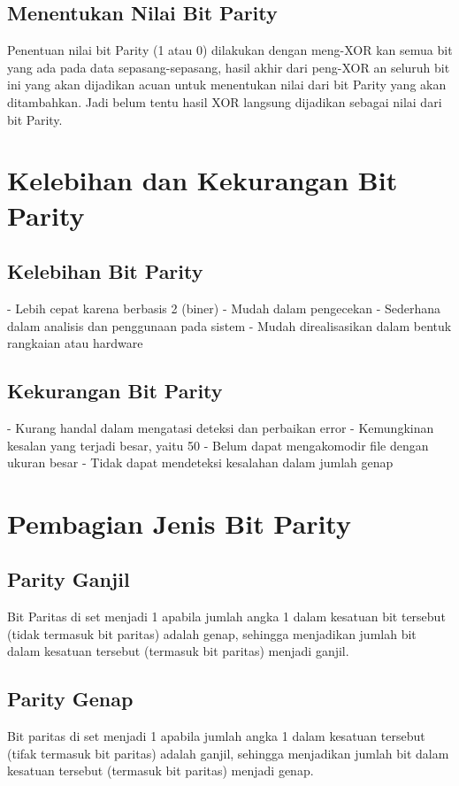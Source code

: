 \subsection{Menentukan Nilai Bit Parity}
Penentuan nilai bit Parity (1 atau 0) dilakukan dengan meng-XOR kan semua bit yang ada pada data sepasang-sepasang, hasil akhir dari peng-XOR an seluruh bit ini yang akan dijadikan acuan untuk menentukan nilai dari bit Parity yang akan ditambahkan. Jadi belum tentu hasil XOR langsung dijadikan sebagai nilai dari bit Parity.



\section{Kelebihan dan Kekurangan Bit Parity}
\subsection{Kelebihan Bit Parity}
-   Lebih cepat karena berbasis 2 (biner)
-   Mudah dalam pengecekan
-   Sederhana dalam analisis dan penggunaan pada sistem
-   Mudah direalisasikan dalam bentuk rangkaian atau hardware

\subsection{Kekurangan Bit Parity}
-   Kurang handal dalam mengatasi deteksi dan perbaikan error
-   Kemungkinan kesalan yang terjadi besar, yaitu 50%
-   Belum dapat mengakomodir file dengan ukuran besar
-   Tidak dapat mendeteksi kesalahan dalam jumlah genap



\section{Pembagian Jenis Bit Parity}
\subsection{Parity Ganjil}
Bit Paritas di set menjadi 1 apabila jumlah angka 1 dalam kesatuan bit tersebut (tidak termasuk bit paritas) adalah genap, sehingga menjadikan jumlah bit dalam kesatuan tersebut (termasuk bit paritas) menjadi ganjil.
 
\subsection{Parity Genap}
Bit paritas di set menjadi 1 apabila jumlah angka 1 dalam kesatuan tersebut (tifak termasuk bit paritas) adalah ganjil, sehingga menjadikan jumlah bit dalam kesatuan tersebut (termasuk bit paritas) menjadi genap.




